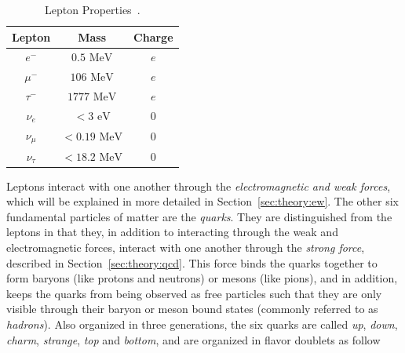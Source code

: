 \begin{table}[h!]
\begin{center}
\begin{tabular}{|c|c|c|}%
\hline
Lepton        & Mass           & Charge \\%
\hline
$e^{-}$      & $0.5 \mbox{ MeV}$      & $e$ \\%
$\mu^{-}$    & $106 \mbox{ MeV}$      & $e$ \\%
$\tau^{-}$   & $1777 \mbox{ MeV}$     & $e$ \\%
\hline                                      
$\nu_{e}$    & $< 3 \mbox{ eV}$       & $0$ \\%
$\nu_{\mu}$  & $< 0.19 \mbox{ MeV}$   & $0$ \\%
$\nu_{\tau}$ & $< 18.2 \mbox{ MeV}$   & $0$  \\%
\hline
\end{tabular}
\end{center}
\caption{Lepton Properties~\cite{Patrignani:2016xqp}.}
\label{table:theory:lepprop}
\end{table}
Leptons interact with one another through the \emph{electromagnetic and weak forces}, which will be explained in more detailed in Section~\ref{sec:theory:ew}.\newline
The other six fundamental particles of matter are the \emph{quarks}. They are distinguished from the leptons in that they, in addition to interacting through the weak and electromagnetic forces, interact with one another through the \emph{strong force}, described in Section~\ref{sec:theory:qcd}. This force binds the quarks together to form baryons (like protons and neutrons) or mesons (like pions), and in addition, keeps the quarks from being observed as free particles such that they are only visible through their baryon or meson bound states (commonly referred to as \emph{hadrons}). Also organized in three generations, the six quarks are called \textit{up}, \textit{down}, \textit{charm}, \textit{strange}, \textit{top} and \textit{bottom}, and are organized in flavor doublets as follow
